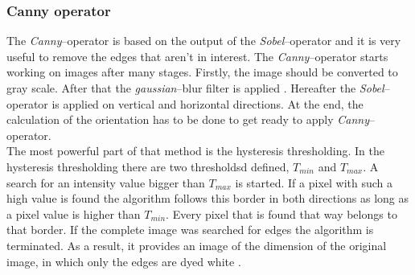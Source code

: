 \documentclass[journal,final,a4paper,twoside]{PS}
\begin{document}
\subsubsection{Canny operator}
The \emph{Canny}--operator is based on the output of the \emph{Sobel}--operator and it is very useful to remove the edges that aren't in interest. 
The \emph{Canny}--operator starts working on images after many stages. Firstly, the image should be converted to gray scale. After that the \emph{gaussian}--blur filter is applied \cite{opencv}. Hereafter the \emph{Sobel}--operator is applied on vertical and horizontal directions. At the end, the calculation of the orientation has to be done to get ready to apply \emph{Canny}--operator.
\\
The most powerful part of that method is the hysteresis thresholding. In the hysteresis thresholding there are two thresholdsd defined, $T_{min}$ and $T_{max}$. A search for an intensity value bigger than $T_{max}$ is started. If a pixel with such a high value is found the algorithm follows this border in both directions as long as a pixel value is higher than $T_{min}$. Every pixel that is found that way belongs to that border. If the complete image was searched for edges the algorithm is terminated. As a result, it provides an image of the dimension of the original image, in which only the edges are dyed white \cite{opencv}.
\end{document}
